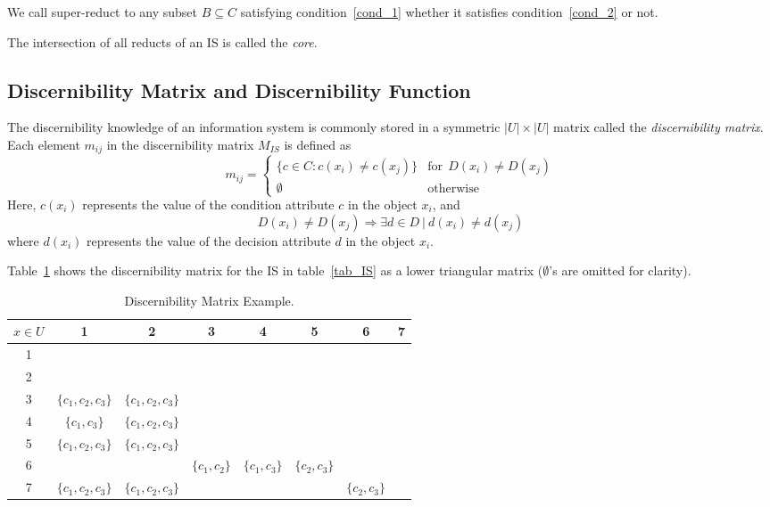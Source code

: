 \documentclass[authoryear,11pt]{elsarticle}
\begin{document}
  We call super-reduct to any subset $B \subseteq C$ satisfying condition~\ref{cond_1} whether it satisfies
  condition~\ref{cond_2} or not.
  
  The intersection of all reducts of an IS is called the \textit{core}.
  
\subsection{Discernibility Matrix and Discernibility Function}
  The discernibility knowledge of an information system is commonly stored in a symmetric $|U| \times |U|$
  matrix called the \textit{discernibility matrix}. Each element $m_{ij}$ in the discernibility matrix 
  $M_{IS}$ is defined as   
  \begin{equation}
  	m_{ij}=\left\lbrace\begin{array}{cl}
  			\lbrace c \in C: c(x_i) \neq c(x_j) \rbrace & \mathrm{for~~}D(x_i) \neq D(x_j)\\
  			\emptyset 								   & \mathrm{otherwise} 
  	\end{array}\right.
  \end{equation}  
  Here, $c(x_i)$ represents the value of the condition attribute $c$ in the object $x_i$, and 
  $$D(x_i) \neq D(x_j) \Rightarrow \exists d \in D~ |~ d(x_i) \neq d(x_j)$$ 
  where $d(x_i)$ represents the value  of the decision attribute $d$ in the object $x_i$.
  
  Table~\ref{tab_DM} shows the discernibility matrix for the IS in table~\ref{tab_IS} as a lower triangular 
  matrix ($\emptyset$'s are omitted for clarity).
  
   \begin{table}[htb]
		\caption{Discernibility Matrix Example.} \label{tab_DM}
		\centering
 	\begin{tabular}{c|ccccccc}
 		$x \in U$ & 1 & 2 &  3 & 4 & 5 &  6 & 7\\
 		\hline
		1 &&&&&&&\\
		2 &&&&&&&\\
		3 & $\lbrace c_1,c_2,c_3\rbrace$ & $\lbrace c_1,c_2,c_3\rbrace$ &&&&&\\
		4 & $\lbrace c_1,c_3\rbrace$ & $\lbrace c_1,c_2,c_3\rbrace$ &&&&&\\
		5 & $\lbrace c_1,c_2,c_3\rbrace$ & $\lbrace c_1,c_2,c_3\rbrace$ &&&&&\\
		6 &&& $\lbrace c_1,c_2\rbrace$ & $\lbrace c_1,c_3\rbrace$ & $\lbrace c_2,c_3\rbrace$ &&\\
		7 & $\lbrace c_1,c_2,c_3\rbrace$ & $\lbrace c_1,c_2,c_3\rbrace$ &&&& $\lbrace c_2,c_3\rbrace$ &\\
 	\end{tabular}             
 \end{table}
  
\end{document}
